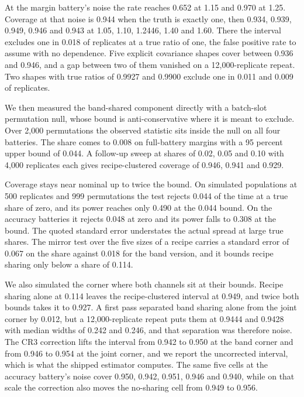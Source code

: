 At the margin battery's noise the rate reaches 0.652 at 1.15 and 0.970 at 1.25. Coverage at that noise is 0.944 when the truth is exactly one, then 0.934, 0.939, 0.949, 0.946 and 0.943 at 1.05, 1.10, 1.2446, 1.40 and 1.60. There the interval excludes one in 0.018 of replicates at a true ratio of one, the false positive rate to assume with no dependence. Five explicit covariance shapes cover between 0.936 and 0.946, and a gap between two of them vanished on a 12,000-replicate repeat. Two shapes with true ratios of 0.9927 and 0.9900 exclude one in 0.011 and 0.009 of replicates.

We then measured the band-shared component directly with a batch-slot permutation null, whose bound is anti-conservative where it is meant to exclude. Over 2,000 permutations the observed statistic sits inside the null on all four batteries. The share comes to 0.008 on full-battery margins with a 95 percent upper bound of 0.044. A follow-up sweep at shares of 0.02, 0.05 and 0.10 with 4,000 replicates each gives recipe-clustered coverage of 0.946, 0.941 and 0.929.

Coverage stays near nominal up to twice the bound. On simulated populations at 500 replicates and 999 permutations the test rejects 0.044 of the time at a true share of zero, and its power reaches only 0.490 at the 0.044 bound. On the accuracy batteries it rejects 0.048 at zero and its power falls to 0.308 at the bound. The quoted standard error understates the actual spread at large true shares. The mirror test over the five sizes of a recipe carries a standard error of 0.067 on the share against 0.018 for the band version, and it bounds recipe sharing only below a share of 0.114.

We also simulated the corner where both channels sit at their bounds. Recipe sharing alone at 0.114 leaves the recipe-clustered interval at 0.949, and twice both bounds takes it to 0.927. A first pass separated band sharing alone from the joint corner by 0.012, but a 12,000-replicate repeat puts them at 0.9444 and 0.9428 with median widths of 0.242 and 0.246, and that separation was therefore noise. The CR3 correction lifts the interval from 0.942 to 0.950 at the band corner and from 0.946 to 0.954 at the joint corner, and we report the uncorrected interval, which is what the shipped estimator computes. The same five cells at the accuracy battery's noise cover 0.950, 0.942, 0.951, 0.946 and 0.940, while on that scale the correction also moves the no-sharing cell from 0.949 to 0.956.

